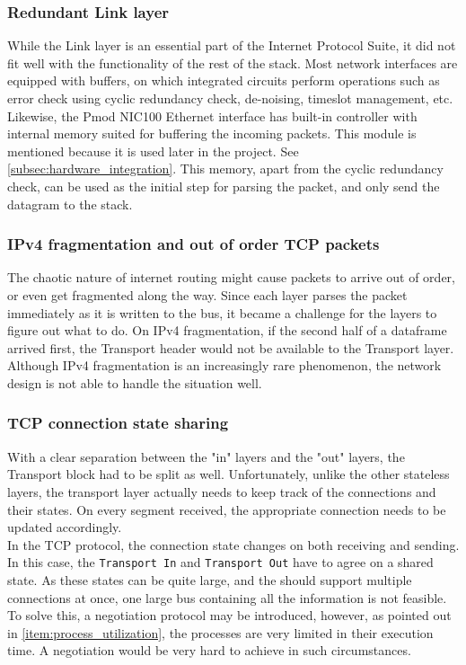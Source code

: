 \subsubsection{Redundant Link layer}
While the Link layer is an essential part of the Internet Protocol Suite, it did
not fit well with the functionality of the rest of the stack.
Most network interfaces are equipped with buffers, on which integrated circuits
perform operations such as error check using cyclic redundancy check, de-noising,
timeslot management, etc.
Likewise, the Pmod NIC100 Ethernet interface has built-in controller with
internal memory suited for buffering the incoming packets\cite{microchip_enc424j600}.
This module is mentioned because it is used later in the project. See \autoref{subsec:hardware_integration}.
This memory, apart from the cyclic redundancy check, can be used as the initial
step for parsing the packet, and only send the datagram to the stack.


\subsubsection{IPv4 fragmentation and out of order TCP packets}
The chaotic nature of internet routing might cause packets to arrive out of order,
or even get fragmented along the way. Since each layer parses the packet immediately
as it is written to the bus, it became a challenge for the layers to figure out
what to do. On IPv4 fragmentation, if the second half of a dataframe arrived
first, the Transport header would not be available to the Transport layer.
Although IPv4 fragmentation is an increasingly rare phenomenon, the network
design is not able to handle the situation well.


\subsubsection{TCP connection state sharing}
With a clear separation between the "in" layers and the "out" layers, the
Transport block had to be split as well. Unfortunately, unlike the other stateless
layers, the transport layer actually needs to keep track of the connections and
their states. On every segment received, the appropriate connection needs to be
updated accordingly.\\
In the TCP protocol, the connection state changes on both receiving and sending.
In this case, the \texttt{Transport In} and \texttt{Transport Out} have to
agree on a shared state. As these states can be quite large, and the should
support multiple connections at once, one large bus containing all the information
is not feasible. To solve this, a negotiation protocol may be introduced, however,
as pointed out in \autoref{item:process_utilization}, the processes are very
limited in their execution time. A negotiation would be very hard to achieve in
such circumstances.


